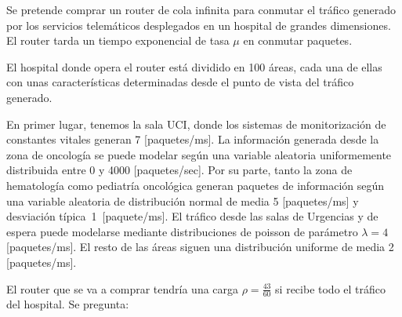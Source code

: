 \documentclass{upmassignment}
\date{\today}
\begin{document}
Se pretende comprar un router de cola infinita
para conmutar el tráfico generado por los servicios telemáticos desplegados en un hospital de grandes dimensiones.
El router tarda un tiempo exponencial de tasa
$\mu$ en conmutar paquetes.

El hospital donde opera el router está dividido en 100 áreas, cada una de ellas con unas características determinadas desde el punto de vista del tráfico generado.

En primer lugar, tenemos la sala UCI, donde los sistemas de monitorización de constantes vitales generan 7 [paquetes/ms]. La información generada desde la zona de oncología se puede modelar según una variable aleatoria uniformemente distribuida entre 0 y 4000 [paquetes/sec]. Por su parte, tanto la zona de hematología como pediatría oncológica generan paquetes de información según una variable aleatoria de distribución normal de media 5 [paquetes/ms] y desviación típica~1~[paquete/ms]. El tráfico desde las salas de Urgencias y de espera puede modelarse mediante distribuciones de poisson de parámetro $\lambda=4$ [paquetes/ms]. El resto de las áreas siguen una distribución uniforme de media 2 [paquetes/ms]. 

El router que se va a comprar tendría una
carga $\rho=\tfrac{43}{60}$ si recibe todo
el tráfico del hospital. Se pregunta:
\end{document}
